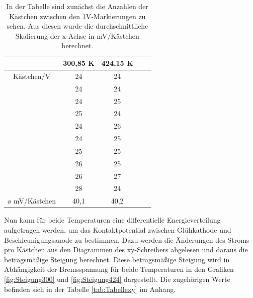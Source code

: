 \documentclass[titlepage = firstcover]{scrartcl}
\begin{document}
            \begin{table}[h]
                \centering
                \caption{In der Tabelle sind zunächst die Anzahlen der Kästchen zwischen den 1V-Markierungen zu sehen. Aus diesen wurde die durchschnittliche Skalierung der x-Achse in mV/Kästchen berechnet.}
                \label{tab:Tabelle1}

                \begin{tabular}{c c c c c}
                    \toprule
                    {} & {300,85 K} & {424,15 K} \\
                    \midrule
                    Kästchen/V    & 24 & 24 \\
                                  & 24 & 24 \\
                                  & 24 & 25 \\
                                  & 25 & 24 \\
                                  & 24 & 26 \\
                                  & 24 & 25 \\
                                  & 25 & 25 \\
                                  & 26 & 25 \\
                                  & 26 & 27 \\
                                  & 28 & 24 \\
                    \o \; mV/Kästchen & 40,1 & 40,2 \\
                    \bottomrule
                \end{tabular}

            \end{table}

            \FloatBarrier
            \noindent
            Nun kann für beide Temperaturen eine differentielle Energieverteilung aufgetragen werden, um das Kontaktpotential zwischen Glühkathode und Beschleunigungsanode zu bestimmen. Dazu werden 
            die Änderungen des Stroms pro Kästchen aus den Diagrammen des xy-Schreibers abgelesen und daraus die betragsmäßige Steigung berechnet. Diese betragsmäßige Steigung wird in Abhängigkeit
            der Bremsspannung für beide Temperaturen in den Grafiken \ref{fig:Steigung300} und \ref{fig:Steigung424} dargestellt. Die zugehörigen Werte befinden sich in der Tabelle 
            \ref{tab:Tabellexy} im Anhang.

            \FloatBarrier
\end{document}
